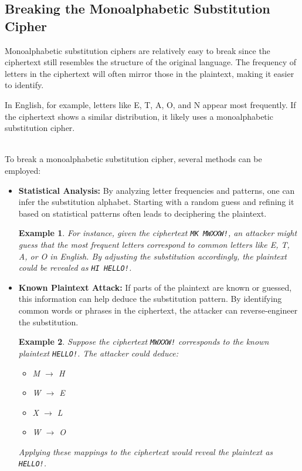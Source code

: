 \documentclass[12pt]{article}
\newtheorem{example}{Example}[section]
\begin{document}
\subsection*{Breaking the Monoalphabetic Substitution Cipher}

Monoalphabetic substitution ciphers are relatively easy to break since the ciphertext still resembles the structure of the original language. The frequency of letters in the ciphertext will often mirror those in the plaintext, making it easier to identify.

In English, for example, letters like E, T, A, O, and N appear most frequently. If the ciphertext shows a similar distribution, it likely uses a monoalphabetic substitution cipher.

~\\
To break a monoalphabetic substitution cipher, several methods can be employed:

\begin{itemize}
    \item \textbf{Statistical Analysis:} By analyzing letter frequencies and patterns, one can infer the substitution alphabet. Starting with a random guess and refining it based on statistical patterns often leads to deciphering the plaintext.
    
    \begin{example}
        For instance, given the ciphertext \texttt{MK MWXXW!}, an attacker might guess that the most frequent letters correspond to common letters like E, T, A, or O in English. By adjusting the substitution accordingly, the plaintext could be revealed as \texttt{HI HELLO!}.
    \end{example}
    
    \item \textbf{Known Plaintext Attack:} If parts of the plaintext are known or guessed, this information can help deduce the substitution pattern. By identifying common words or phrases in the ciphertext, the attacker can reverse-engineer the substitution.
    
    \begin{example}
        Suppose the ciphertext \texttt{MWXXW!} corresponds to the known plaintext \texttt{HELLO!}. The attacker could deduce:
        \begin{itemize}
            \item M $\rightarrow$ H
            \item W $\rightarrow$ E
            \item X $\rightarrow$ L
            \item W $\rightarrow$ O
        \end{itemize}
        Applying these mappings to the ciphertext would reveal the plaintext as \texttt{HELLO!}.
    \end{example}
\end{itemize}
\end{document}
